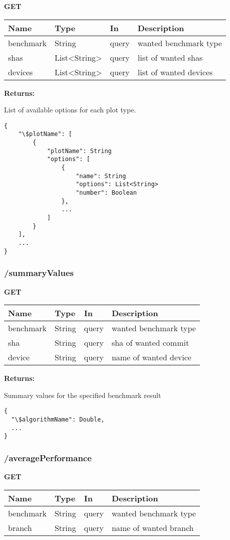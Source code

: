 \textbf{GET}

\begin{tabular}{ l l l l }
  Name & Type & In & Description \\ 
  \hline
  benchmark & String & query & wanted benchmark type \\
  shas & List<String> & query & list of wanted shas \\
  devices & List<String> & query & list of wanted devices \\
  \hline
\end{tabular}

\textbf{Returns: }

List of available options for each plot type.
\begin{lstlisting}
{
    "\$plotName": [
        {
            "plotName": String
            "options": [
                {
                    "name": String
                    "options": List<String>
                    "number": Boolean
                },
                ...
            ]
        }
    ],
    ...
}
\end{lstlisting}

\subsubsection*{/summaryValues}

\textbf{GET}

\begin{tabular}{ l l l l }
  Name & Type & In & Description \\ 
  \hline
  benchmark & String & query & wanted benchmark type \\
  sha & String & query & sha of wanted commit \\
  device & String & query & name of wanted device \\
  \hline
\end{tabular}

\textbf{Returns: }

Summary values for the specified benchmark result
\begin{lstlisting}
{
  "\$algorithmName": Double,
  ...
}
\end{lstlisting}


\subsubsection*{/averagePerformance}

\textbf{GET}

\begin{tabular}{ l l l l }
  Name & Type & In & Description \\ 
  \hline
  benchmark & String & query & wanted benchmark type \\
  branch & String & query & name of wanted branch \\
  \hline
\end{tabular}

